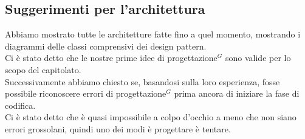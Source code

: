 \subsection{Suggerimenti per l'architettura}
Abbiamo mostrato tutte le architetture fatte fino a quel momento, mostrando i diagrammi delle classi comprensivi dei design pattern.\\
Ci è stato detto che le nostre prime idee di progettazione$^G$ sono valide per lo scopo del capitolato.\\
Successivamente abbiamo chiesto se, basandosi sulla loro esperienza, fosse possibile riconoscere errori di progettazione$^G$ prima ancora di iniziare la fase di codifica. \\
Ci è stato detto che è quasi impossibile a colpo d'occhio a meno che non siano errori grossolani, quindi uno dei modi è progettare è tentare.